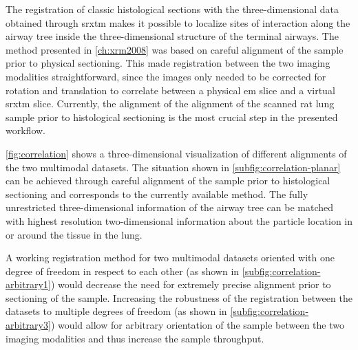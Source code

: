 The registration of classic histological sections with the three-di\-men\-sion\-al data obtained through \ac{srxtm} makes it possible to localize sites of interaction along the airway tree inside the three-dimensional structure of the terminal airways. The method presented in \autoref{ch:xrm2008} was based on careful alignment of the sample prior to physical sectioning. This made registration between the two imaging modalities straightforward, since the images only needed to be corrected for rotation and translation to correlate between a physical \ac{em} slice and a virtual \ac{srxtm} slice. Currently, the alignment of the alignment of the scanned rat lung sample prior to histological sectioning is the most crucial step in the presented workflow.

\autoref{fig:correlation} shows a three-dimensional visualization of different alignments of the two multimodal datasets. The situation shown in \autoref{subfig:correlation-planar} can be achieved through careful alignment of the sample prior to histological sectioning and corresponds to the currently available method. The fully unrestricted three-dimensional information of the airway tree can be matched with highest resolution two-dimensional information about the particle location in or around the tissue in the lung.

A working registration method for two multimodal datasets oriented with one degree of freedom in respect to each other (as shown in \autoref{subfig:correlation-arbitrary1}) would decrease the need for extremely precise alignment prior to sectioning of the sample. Increasing the robustness of the registration between the datasets to multiple degrees of freedom (as shown in \autoref{subfig:correlation-arbitrary3}) would allow for arbitrary orientation of the sample between the two imaging modalities and thus increase the sample throughput.

